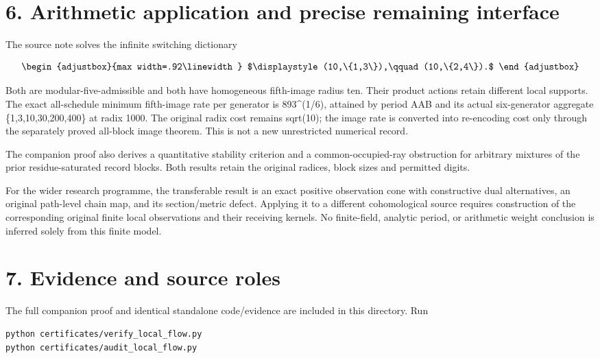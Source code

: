 \section{6. Arithmetic application and precise remaining interface}\label{n27-arithmetic-application-and-precise-remaining-interface}

The source note solves the infinite switching dictionary

\[
\begin{adjustbox}{max width=.92\linewidth}
$\displaystyle (10,\{1,3\}),\qquad(10,\{2,4\}).$
\end{adjustbox}
\]

Both are modular-five-admissible and both have homogeneous fifth-image radius ten. Their product actions retain different local supports. The exact all-schedule minimum fifth-image rate per generator is 893\^{}(1/6), attained by period AAB and its actual six-generator aggregate \{1,3,10,30,200,400\} at radix 1000. The original radix cost remains sqrt(10); the image rate is converted into re-encoding cost only through the separately proved all-block image theorem. This is not a new unrestricted numerical record.

The companion proof also derives a quantitative stability criterion and a common-occupied-ray obstruction for arbitrary mixtures of the prior residue-saturated record blocks. Both results retain the original radices, block sizes and permitted digits.

For the wider research programme, the transferable result is an exact positive observation cone with constructive dual alternatives, an original path-level chain map, and its section/metric defect. Applying it to a different cohomological source requires construction of the corresponding original finite local observations and their receiving kernels. No finite-field, analytic period, or arithmetic weight conclusion is inferred solely from this finite model.

\section{7. Evidence and source roles}\label{n27-evidence-and-source-roles}

The full companion proof and identical standalone code/evidence are included in this directory. Run

\begin{Verbatim}[breaklines=true,breakanywhere=true,fontsize=\footnotesize]
python certificates/verify_local_flow.py
python certificates/audit_local_flow.py
\end{Verbatim}

